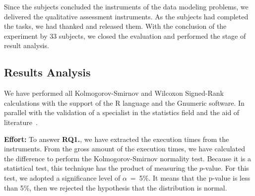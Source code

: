 Since the subjects concluded the instruments of the data modeling problems, we delivered the qualitative assessment instruments.
As the subjects had completed the tasks, we had thanked and released them.
With the conclusion of the experiment by 33 subjects, we closed the evaluation and performed the stage of result analysis.

\subsection{Results Analysis}
\label{ssec_experiments:preliminary_resultAnalysis}

We have performed all Kolmogorov-Smirnov and Wilcoxon Signed-Rank calculations with the support of the R language and the Gnumeric software. In parallel with the validation of a specialist in the statistics field and the aid of literature~\cite{Triola:2018}.

\textbf{Effort:} 
To answer \textbf{RQ1.},  
we have extracted the execution times from the instruments.
From the gross amount of the execution times, we have calculated the difference to perform the Kolmogorov-Smirnov normality test.
Because it is a statistical test, this technique has the product of measuring the $p$-value.
For this test, we adopted a significance level of $\alpha$~=~5\%.
It means that the p-value is less than 5\%, then we rejected the hypothesis that the distribution is normal.

